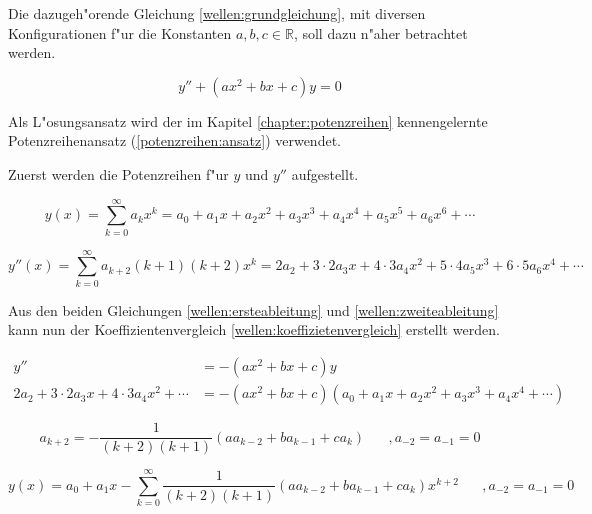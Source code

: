 \begin{refsection}
Die dazugeh"orende Gleichung 
\ref{wellen:grundgleichung}, mit diversen Konfigurationen f"ur die Konstanten 
${a,b,c} \in \mathbb{R}$, soll dazu n"aher betrachtet werden.

\begin{equation}
	y'' + (ax^2+bx+c)y
	=
	0
	\label{wellen:grundgleichung}
\end{equation}

Als L"osungsansatz wird der im Kapitel \ref{chapter:potenzreihen} 
kennengelernte Potenzreihenansatz (\ref{potenzreihen:ansatz}) verwendet.

Zuerst werden die Potenzreihen f"ur $y$ und $y''$ aufgestellt.

\begin{equation}
	y(x)
	=
	\sum_{k = 0}^{\infty} a_{k}x^k
	=
	a_0 + a_1x + a_2x^2 + a_3x^3 + a_4x^4 + a_5x^5 + a_6x^6 + \dotsb
	\label{wellen:ersteableitung}
\end{equation}

\begin{equation}
	y''(x)
	=
	\sum_{k = 0}^{\infty} a_{k+2}(k+1)(k+2)x^k
	=
	2a_2 + 3 \mathbin{\cdot} 2a_3x + 4 \mathbin{\cdot} 3a_4x^2 + 5 
	\mathbin{\cdot} 4a_5x^3 + 6 \mathbin{\cdot} 5a_6x^4 + \dotsb
	\label{wellen:zweiteableitung}
\end{equation}

Aus den beiden Gleichungen \ref{wellen:ersteableitung} und 
\ref{wellen:zweiteableitung} kann nun der Koeffizientenvergleich 
\ref{wellen:koeffizietenvergleich} erstellt werden.

\begin{equation}
	\begin{split}
		y''
		&=
		-(ax^2+bx+c)y \\
		2a_2 + 3 \mathbin{\cdot} 2a_3x + 4 \mathbin{\cdot} 3a_4x^2 + \dotsb
		&=
		-(ax^2+bx+c)(a_0 + a_1x + a_2x^2 + a_3x^3 + a_4x^4 + \dotsb)
	\end{split}
	\label{wellen:koeffizietenvergleich}
\end{equation}

\begin{equation}
	a_{k+2} = -\frac{1}{(k+2)(k+1)} (aa_{k-2}+ba_{k-1}+ca_k)
	\hspace{20pt}, a_{-2} = a_{-1} = 0
	\label{wellen:koeffizientengleichung}
\end{equation}

\begin{equation}
	y(x) = a_0 + a_1x 
	-\sum_{k=0}^{\infty}\frac{1}{(k+2)(k+1)}(aa_{k-2}+ba_{k-1}+ca_k)x^{k+2}
	\hspace{20pt}, a_{-2} = a_{-1} = 0
	\label{wellen:ygleichung}
\end{equation}


\end{refsection}
